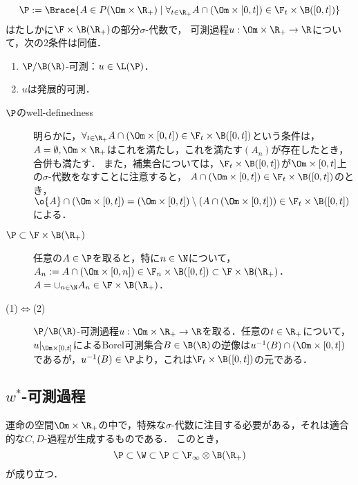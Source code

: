 \documentclass[uplatex,dvipdfmx]{jsreport}
\begin{document}
\begin{theorem}
    \[\P:=\Brace{A\in P(\Om\times\R_+)\mid\forall_{t\in\R_+} A\cap(\Om\times[0,t])\in\F_t\times\B([0,t])}\]
    はたしかに$\F\times\B(\R_+)$の部分$\sigma$-代数で，
    可測過程$u:\Om\times\R_+\to\R$について，次の2条件は同値．
    \begin{enumerate}
        \item $\P/\B(\R)$-可測：$u\in\L(\P)$．
        \item $u$は発展的可測．
    \end{enumerate}
\end{theorem}
\begin{Proof}\mbox{}
    \begin{description}
        \item[$\P$のwell-definedness] 明らかに，$\forall_{t\in\R_+} A\cap(\Om\times[0,t])\in\F_t\times\B([0,t])$という条件は，$A=\emptyset,\Om\times\R_+$はこれを満たし，これを満たす$(A_n)$が存在したとき，合併も満たす．
        また，補集合については，$\F_t\times\B([0,t])$が$\Om\times[0,t]$上の$\sigma$-代数をなすことに注意すると，
        $A\cap(\Om\times[0,t])\in\F_t\times\B([0,t])$のとき，
        $\o{A}\cap(\Om\times[0,t])=(\Om\times[0,t])\setminus (A\cap(\Om\times[0,t]))\in\F_t\times\B([0,t])$による．
        \item[$\P\subset\F\times\B(\R_+)$] 
        任意の$A\in\P$を取ると，特に$n\in\N$について，$A_n:=A\cap(\Om\times[0,n])\in\F_n\times\B([0,t])\subset\F\times\B(\R_+)$．
        $A=\cup_{n\in\N}A_n\in\F\times\B(\R_+)$．
        \item[(1)$\Leftrightarrow$(2)] $\P/\B(\R)$-可測過程$u:\Om\times\R_+\to\R$を取る．任意の$t\in\R_+$について，$u|_{\Om\times[0,t]}$によるBorel可測集合$B\in\B(\R)$の逆像は$u^{-1}(B)\cap(\Om\times[0,t])$であるが，$u^{-1}(B)\in\P$より，これは$\F_t\times\B([0,t])$の元である．
    \end{description}
\end{Proof}

\subsection{$w^*$-可測過程}

\begin{tcolorbox}[colframe=ForestGreen, colback=ForestGreen!10!white,breakable,colbacktitle=ForestGreen!40!white,coltitle=black,fonttitle=\bfseries\sffamily,
title=]
    運命の空間$\Om\times\R_+$の中で，特殊な$\sigma$-代数に注目する必要がある，それは適合的な$C,D$-過程が生成するものである．
    このとき，\[\P\subset\W\subset\P\subset\F_\infty\otimes\B(\R_+)\]が成り立つ．
\end{tcolorbox}
\end{document}
